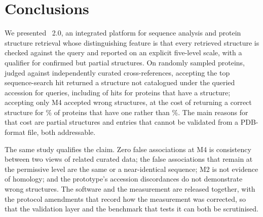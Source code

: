 \section{Conclusions}
\label{sec:conclusions}

We presented \bsi\ 2.0, an integrated platform for sequence analysis and protein
structure retrieval whose distinguishing feature is that every retrieved structure
is checked against the query and reported on an explicit five-level scale, with a
qualifier for confirmed but partial structures. On  randomly sampled
proteins, judged against independently curated cross-references, accepting the top
sequence-search hit returned a structure not catalogued under the queried accession
for  queries, including  of  hits for
proteins that have a structure; accepting only M4 accepted  wrong
structures, at the cost of returning a correct structure for \% of
proteins that have one rather than \%. The main reasons for that cost
are partial structures and entries that cannot be validated from a PDB-format file,
both addressable.

The same study qualifies the claim. Zero false associations at M4 is consistency
between two views of related curated data; the false associations that remain
at the permissive level are the same or a near-identical sequence; M2 is not
evidence of homology; and the prototype's accession discordances do not
demonstrate wrong structures. The software and the measurement are released
together, with the protocol amendments that record how the measurement was
corrected, so that the validation layer and the benchmark that tests it can both
be scrutinised.
